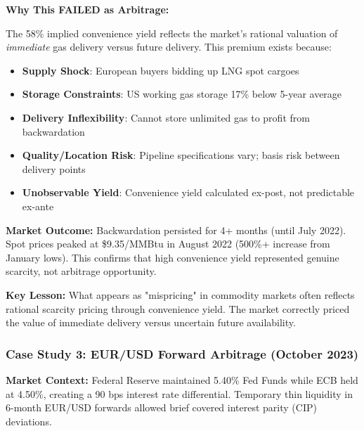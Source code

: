 \documentclass[12pt,a4paper]{article}
\begin{document}
\textbf{Why This FAILED as Arbitrage:}

The 58\% implied convenience yield reflects the market's rational valuation of \textit{immediate} gas delivery versus future delivery. This premium exists because:

\begin{itemize}
    \item \textbf{Supply Shock}: European buyers bidding up LNG spot cargoes
    \item \textbf{Storage Constraints}: US working gas storage 17\% below 5-year average
    \item \textbf{Delivery Inflexibility}: Cannot store unlimited gas to profit from backwardation
    \item \textbf{Quality/Location Risk}: Pipeline specifications vary; basis risk between delivery points
    \item \textbf{Unobservable Yield}: Convenience yield calculated ex-post, not predictable ex-ante
\end{itemize}

\textbf{Market Outcome:} Backwardation persisted for 4+ months (until July 2022). Spot prices peaked at \$9.35/MMBtu in August 2022 (500\%+ increase from January lows). This confirms that high convenience yield represented genuine scarcity, not arbitrage opportunity.

\textbf{Key Lesson:} What appears as "mispricing" in commodity markets often reflects rational scarcity pricing through convenience yield. The market correctly priced the value of immediate delivery versus uncertain future availability.

\subsubsection{Case Study 3: EUR/USD Forward Arbitrage (October 2023)}

\textbf{Market Context:} Federal Reserve maintained 5.40\% Fed Funds while ECB held at 4.50\%, creating a 90 bps interest rate differential. Temporary thin liquidity in 6-month EUR/USD forwards allowed brief covered interest parity (CIP) deviations.
\end{document}
